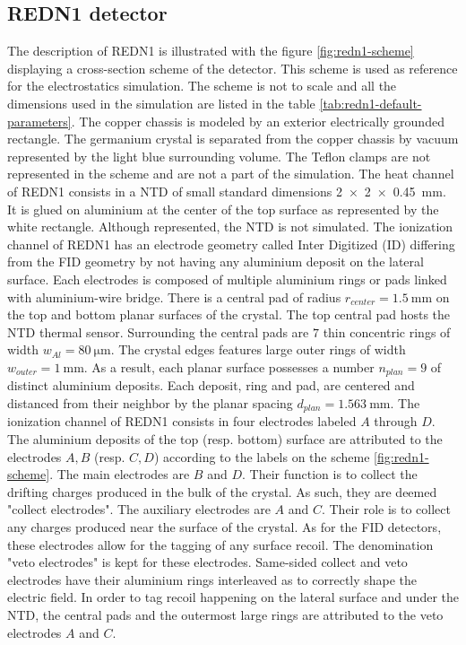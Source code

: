 \subsection{REDN1 detector}
\label{par:redn1-presentation}

The description of REDN1 is illustrated with the figure \ref{fig:redn1-scheme} displaying a cross-section scheme of the detector. This scheme is used as reference for the electrostatics simulation. The scheme is not to scale and all the dimensions used in the simulation are listed in the table \ref{tab:redn1-default-parameters}.
The copper chassis is modeled by an exterior electrically grounded rectangle. The germanium crystal is separated from the copper chassis by vacuum represented by the light blue surrounding volume.
The Teflon clamps are not represented in the scheme and are not a part of the simulation.
The heat channel of REDN1 consists in a NTD of small standard dimensions \SI{2 x 2 x 0.45}{\mm}. It is glued on aluminium at the center of the top surface as represented by the white rectangle. Although represented, the NTD is not simulated.
The ionization channel of REDN1 has an electrode geometry called Inter Digitized (ID) differing from the FID geometry by not having any aluminium deposit on the lateral surface. Each electrodes is composed of multiple aluminium rings or pads linked with aluminium-wire bridge. There is a central pad of radius $r_{center}=\SI{1.5}{\mm}$ on the top and bottom planar surfaces of the crystal. The top central pad hosts the NTD thermal sensor. Surrounding the central pads are $7$ thin concentric rings of width $w_{Al} = \SI{80}{\micro\meter}$. The crystal edges features large outer rings of width $w_{outer}=\SI{1}{\mm}$. As a result, each planar surface possesses a number $n_{plan}=9$ of distinct aluminium deposits. Each deposit, ring and pad, are centered and distanced from their neighbor by the planar spacing $d_{plan} = \SI{1.563}{\mm}$.
The ionization channel of REDN1 consists in four electrodes labeled $A$ through $D$. The aluminium deposits of the top (resp. bottom) surface are attributed to the electrodes $A,B$ (resp. $C,D$) according to the labels on the scheme \ref{fig:redn1-scheme}.
The main electrodes are $B$ and $D$. Their function is to collect the drifting charges produced in the bulk of the crystal. As such, they are deemed "collect electrodes".
The auxiliary electrodes are $A$ and $C$. Their role is to collect any charges produced near the surface of the crystal. As for the FID detectors, these electrodes allow for the tagging of any surface recoil. The denomination "veto electrodes" is kept for these electrodes.
Same-sided collect and veto electrodes have their aluminium rings interleaved as to correctly shape the electric field. In order to tag recoil happening on the lateral surface and under the NTD, the central pads and the outermost large rings are attributed to the veto electrodes $A$ and $C$. 


